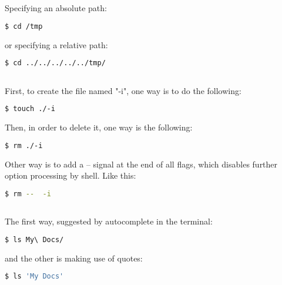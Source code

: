 \documentclass[paper=a4, fontsize=11pt]{scrartcl} %
\numberwithin{equation}{section} %
\numberwithin{figure}{section} %
\numberwithin{table}{section} %
\begin{document}
\begin{onehalfspacing}
\subsection{\textbf{}}

Specifying an absolute path:

\begin{lstlisting}[language=bash]
  $ cd /tmp
\end{lstlisting}

or specifying a relative path:

\begin{lstlisting}[language=bash]
  $ cd ../../../../../tmp/
\end{lstlisting}

\subsection{\textbf{}}

First, to create the file named "-i", one way is to do the following:

\begin{lstlisting}[language=bash]
  $ touch ./-i
\end{lstlisting}

Then, in order to delete it, one way is the following:

\begin{lstlisting}[language=bash]
  $ rm ./-i
\end{lstlisting}

Other way is to add a -- signal at the end of all flags, which disables further option processing by shell. Like this:

\begin{lstlisting}[language=bash]
  $ rm --  -i
\end{lstlisting}


\subsection{\textbf{}}

The first way, suggested by autocomplete in the terminal:

\begin{lstlisting}[language=bash]
  $ ls My\ Docs/
\end{lstlisting}

and the other is making use of quotes:

\begin{lstlisting}[language=bash]
  $ ls 'My Docs'
\end{lstlisting}



\end{onehalfspacing}
\end{document}

